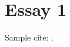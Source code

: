 \documentclass[11pt]{article}
\begin{document}
\section{Essay 1}
Sample cite: \citet{Nobody06}.

\newpage

\end{document}
